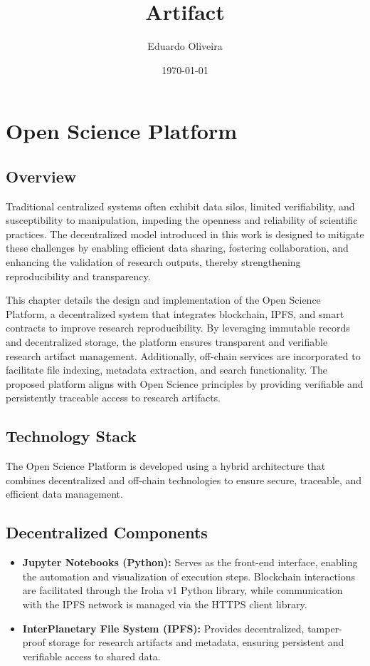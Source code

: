 \documentclass{article}
\title{Artifact}
\author{Eduardo Oliveira}
\date{\today}
\begin{document}
\maketitle

\section{Open Science Platform}

\subsection{Overview}

Traditional centralized systems often exhibit data silos, limited verifiability, and susceptibility to manipulation, impeding the openness and reliability of scientific practices. The decentralized model introduced in this work is designed to mitigate these challenges by enabling efficient data sharing, fostering collaboration, and enhancing the validation of research outputs, thereby strengthening reproducibility and transparency.

This chapter details the design and implementation of the Open Science Platform, a decentralized system that integrates blockchain, IPFS, and smart contracts to improve research reproducibility. By leveraging immutable records and decentralized storage, the platform ensures transparent and verifiable research artifact management. Additionally, off-chain services are incorporated to facilitate file indexing, metadata extraction, and search functionality. The proposed platform aligns with Open Science principles by providing verifiable and persistently traceable access to research artifacts.

\subsection{Technology Stack}
The Open Science Platform is developed using a hybrid architecture that combines decentralized and off-chain technologies to ensure secure, traceable, and efficient data management.

\subsection{Decentralized Components}

\begin{itemize}
    \item \textbf{Jupyter Notebooks (Python):} Serves as the front-end interface, enabling the automation and visualization of execution steps. Blockchain interactions are facilitated through the Iroha v1 Python library, while communication with the IPFS network is managed via the HTTPS client library.
    \item \textbf{InterPlanetary File System (IPFS):} Provides decentralized, tamper-proof storage for research artifacts and metadata, ensuring persistent and verifiable access to shared data.
\end{itemize}
\end{document}
